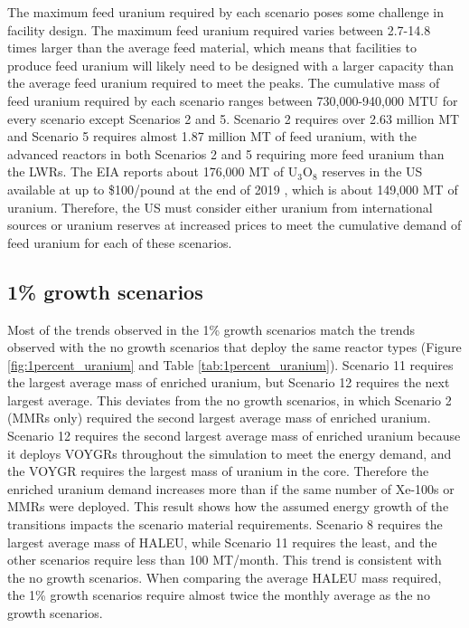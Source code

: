 The maximum feed uranium required by each scenario poses some 
challenge in facility design. The maximum feed uranium required varies 
between 2.7-14.8 times larger than the average feed material, which means 
that 
facilities to produce feed uranium will likely need to be designed with a 
larger capacity than the average feed uranium required to meet the peaks. 
The cumulative mass of feed uranium required by each scenario ranges between 
730,000-940,000 MTU for every scenario except Scenarios 2 and 5. 
Scenario 2 requires over 2.63 million MT and 
Scenario 5 requires almost 1.87 million MT of feed uranium, with the 
advanced reactors in both Scenarios 2 and 5 requiring more feed uranium 
than the \glspl{LWR}. The \gls{EIA} reports 
about 176,000 MT of U$_3$O$_8$ reserves in the US available at up to 
\$100/pound at the end of 2019 \cite{us_eia_2020_2021}, which is about 
149,000 MT of uranium. Therefore, the US must consider either uranium 
from international sources or uranium reserves at increased 
prices to meet the cumulative demand of feed 
uranium for each of these scenarios.

\subsection{1\% growth scenarios}
Most of the trends observed in the 1\% growth scenarios match the trends 
observed with the no growth scenarios that deploy the same reactor 
types
(Figure \ref{fig:1percent_uranium} and Table \ref{tab:1percent_uranium}). 
Scenario 11 requires the largest average mass of enriched uranium, but Scenario
12 requires the next largest average. This deviates from the no growth 
scenarios, in which Scenario 2 (\glspl{MMR} only) required the second largest 
average mass of enriched uranium. Scenario 12 requires the second largest 
average mass of enriched uranium because it deploys VOYGRs throughout 
the simulation to meet the energy demand, and the VOYGR requires the largest 
mass of uranium in the core. Therefore the enriched uranium demand increases 
more than if the same number of Xe-100s or \glspl{MMR} were deployed. 
This result shows how the assumed energy growth 
of the transitions impacts the scenario material requirements. 
Scenario 8 requires the largest average
mass of \gls{HALEU}, while Scenario 11 requires the least, and the other 
scenarios require less than 100 MT/month. This trend is consistent with 
the no growth scenarios. When comparing the average 
\gls{HALEU} mass required, the 1\% growth scenarios require almost twice 
the monthly average as the no growth scenarios. 

